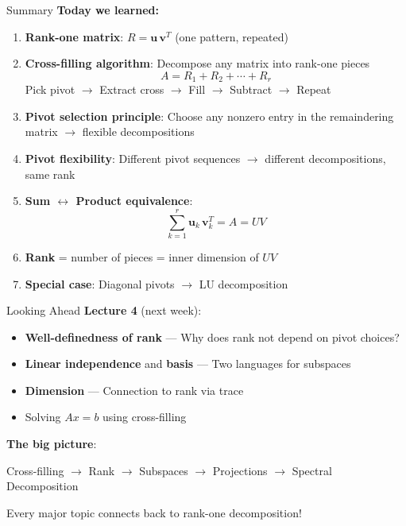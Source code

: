 \documentclass[10pt]{beamer}
\theoremstyle{definition}
\newcommand{\x}[1]{\alert{\textbf{#1}}}
\begin{document}
\begin{frame}{Summary}
\textbf{Today we learned:}

\begin{enumerate}
\item \textbf{Rank-one matrix}: $R = \mathbf{u}\,\mathbf{v}^T$ (one pattern, repeated)

\item \textbf{Cross-filling algorithm}: Decompose any matrix into rank-one pieces
$$A = R_1 + R_2 + \cdots + R_r$$
Pick pivot $\to$ Extract cross $\to$ Fill $\to$ Subtract $\to$ Repeat

\item \textbf{Pivot selection principle}: Choose any nonzero entry in the remaindering matrix $\to$ flexible decompositions

\item \textbf{Pivot flexibility}: Different pivot sequences $\to$ different decompositions, same rank

\item \textbf{Sum $\leftrightarrow$ Product equivalence}:
$$\sum_{k=1}^r \mathbf{u}_k\,\mathbf{v}_k^T = A = UV$$

\item \textbf{Rank} = number of pieces = inner dimension of $UV$

\item \textbf{Special case}: Diagonal pivots $\to$ LU decomposition
\end{enumerate}
\end{frame}

\begin{frame}{Looking Ahead}
\textbf{Lecture 4} (next week):
\begin{itemize}
\item \x{Well-definedness of rank} — Why does rank not depend on pivot choices?
\item \x{Linear independence} and \x{basis} — Two languages for subspaces
\item \x{Dimension} — Connection to rank via trace
\item Solving $Ax = b$ using cross-filling
\end{itemize}

\vfill
\textbf{The big picture}:
\begin{center}
Cross-filling $\to$ Rank $\to$ Subspaces $\to$ Projections $\to$ Spectral Decomposition
\end{center}

Every major topic connects back to rank-one decomposition!
\end{frame}
\end{document}
